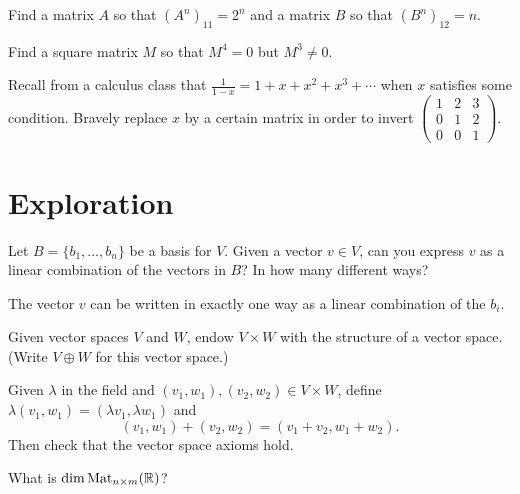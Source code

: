 \documentclass{homework}
\begin{document}
\begin{problem}
  Find a matrix $A$ so that $(A^n)_{11} = 2^n$ and a matrix $B$ so that $(B^n)_{12} = n$.
\end{problem}

\begin{problem}
  Find a square matrix $M$ so that $M^4 = 0$ but $M^3 \neq 0$.
\end{problem}

\begin{problem}\label{inverse-via-calculus}Recall from a calculus class that
  $\frac{1}{1-x} = 1 + x + x^2 + x^3 + \cdots$ when $x$ satisfies some
  condition.  Bravely replace $x$ by a certain matrix in order to
  invert
  $\begin{pmatrix} 1 & 2 & 3 \\ 0 & 1 & 2 \\ 0 & 0 & 1 \end{pmatrix}$.
\end{problem}

\section{Exploration}

\begin{problem}
  Let $B = \{ b_1, \ldots, b_n \}$ be a basis for $V$.  Given a vector
  $v \in V$, can you express $v$ as a linear
  combination of the vectors in $B$?  In how many different ways?
\end{problem}

\begin{solution}
  The vector $v$ can be written in exactly one way as a linear combination of the $b_i$.
\end{solution}

\begin{problem}\label{direct-sum-of-spaces}Given vector spaces $V$ and $W$, endow $V \times W$ with the
  structure of a vector space.  (Write $V \oplus W$ for this
  vector space.)
\end{problem}

\begin{solution}
  Given $\lambda$ in the field and $(v_1,w_1), (v_2,w_2) \in V \times W$, define $\lambda (v_1,w_1) = (\lambda v_1, \lambda w_1)$ and
  \[
    (v_1,w_1) + (v_2,w_2) = (v_1 + v_2, w_1 + w_2).
  \]
  Then check that the vector space axioms hold.
\end{solution}

\begin{problem}
  What is $\dim \operatorname{Mat}_{n \times m}(\mathbb{R})$?
\end{problem}
\end{document}
